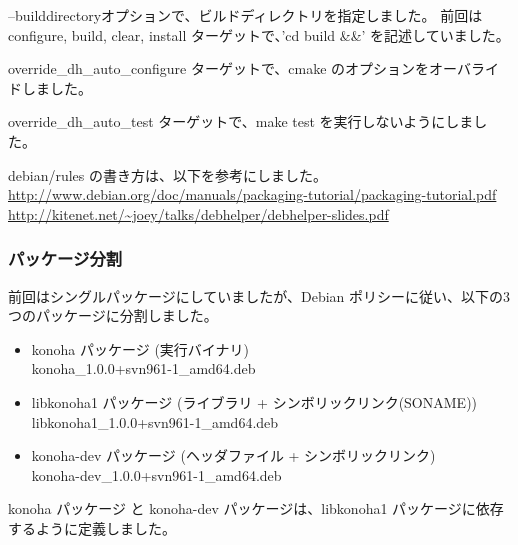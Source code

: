 \documentclass[mingoth,a4paper]{jsarticle}
\begin{document}
--builddirectoryオプションで、ビルドディレクトリを指定しました。
前回は configure, build, clear, install ターゲットで、'cd build \&\&' を記述していました。

override\_dh\_auto\_configure ターゲットで、cmake のオプションをオーバライドしました。

override\_dh\_auto\_test ターゲットで、make test を実行しないようにしました。

debian/rules の書き方は、以下を参考にしました。\\
\url{http://www.debian.org/doc/manuals/packaging-tutorial/packaging-tutorial.pdf}\\
\url{http://kitenet.net/~joey/talks/debhelper/debhelper-slides.pdf}

\subsubsection{パッケージ分割}
前回はシングルパッケージにしていましたが、Debian ポリシーに従い、以下の3つのパッケージに分割しました。

\begin{itemize}
\item konoha パッケージ (実行バイナリ)\\
  konoha\_1.0.0+svn961-1\_amd64.deb
\item libkonoha1 パッケージ (ライブラリ + シンボリックリンク(SONAME))\\
  libkonoha1\_1.0.0+svn961-1\_amd64.deb
\item konoha-dev パッケージ (ヘッダファイル + シンボリックリンク)\\
  konoha-dev\_1.0.0+svn961-1\_amd64.deb
\end{itemize}

konoha パッケージ と konoha-dev パッケージは、libkonoha1 パッケージに依存するように定義しました。
\end{document}
